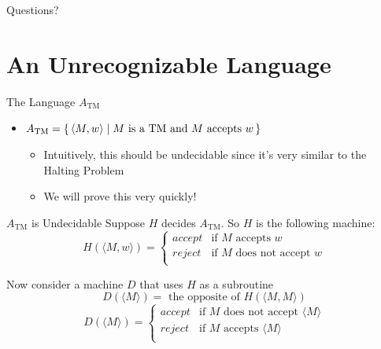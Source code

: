 \documentclass[aspectratio=169]{beamer}
\begin{document}
\begin{frame}{}
    \begin{center}
        {\color{sigma@mainblue} \LARGE Questions?}
    \end{center}
\end{frame}
\section{An Unrecognizable Language}

\frame{\sectionpage}

\begin{frame}{The Language $A_{\text{TM}}$}
    \begin{itemize}
        \item $A_{\text{TM}} = \set{\langle M, w \rangle | \text{$M$ is a TM and $M$ accepts $w$}}$ 
        \begin{itemize}
            \item Intuitively, this should be undecidable since it's very similar to the Halting Problem \pause
            \item We will prove this very quickly!
        \end{itemize}
    \end{itemize}
\end{frame}

\begin{frame}{$A_{\text{TM}}$ is Undecidable}
    Suppose $H$ decides $A_{\text{TM}}$. So $H$ is the following machine:
    $$ H(\langle M, w \rangle) = 
        \begin{cases}
            \mathit{accept} & \text{if $M$ accepts $w$} \\
            \mathit{reject} & \text{if $M$ does not accept $w$} \\
        \end{cases}
    $$ \pause
    
    Now consider a machine $D$ that uses $H$ as a subroutine
    $$D(\langle M \rangle) = \text{ the opposite of } H(\langle M, M \rangle)$$ 
    \pause
    $$ D(\langle M \rangle) = 
        \begin{cases}
            \mathit{accept} & \text{if $M$ does not accept $\langle M \rangle$} \\
            \mathit{reject} & \text{if $M$ accepts $\langle M \rangle$} \\
        \end{cases}
    $$
\end{frame}
\end{document}
